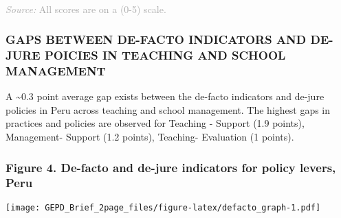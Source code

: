 \documentclass[twocolumn]{article}
\begin{document}
\begin{table}[H]
\\
{\scriptsize
    \textcolor{darkgray}{\textit{Source:} All scores are on a (0-5) scale.}
  }

\end{table}
\raggedbottom

\hypertarget{gaps-between-de-facto-indicators-and-de-jure-poicies-in-teaching-and-school-management}{%
\subsubsection{\texorpdfstring{\textbf{GAPS BETWEEN DE-FACTO INDICATORS
AND DE-JURE POICIES IN TEACHING AND SCHOOL
MANAGEMENT}}{GAPS BETWEEN DE-FACTO INDICATORS AND DE-JURE POICIES IN TEACHING AND SCHOOL MANAGEMENT}}\label{gaps-between-de-facto-indicators-and-de-jure-poicies-in-teaching-and-school-management}}

A \textasciitilde{}0.3 point average gap exists between the de-facto
indicators and de-jure policies in Peru across teaching and school
management. The highest gaps in practices and policies are observed for
Teaching - Support (1.9 points), Management- Support (1.2 points),
Teaching- Evaluation (1 points).

\hypertarget{figure-4.-de-facto-and-de-jure-indicators-for-policy-levers-peru}{%
\subsubsection{Figure 4. De-facto and de-jure indicators for policy
levers,
Peru}\label{figure-4.-de-facto-and-de-jure-indicators-for-policy-levers-peru}}

\texttt{[image: GEPD\_Brief\_2page\_files/figure-latex/defacto\_graph-1.pdf]}
\end{document}
